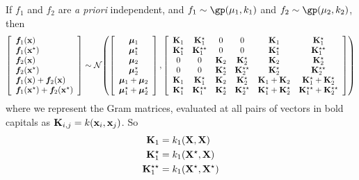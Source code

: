 If $f_1$ and $f_2$ are \emph{a priori} independent, and $f_1 \sim \gp( \mu_1, k_1)$ and $f_2 \sim \gp( \mu_2, k_2)$, then
%
\begin{align}
\left[ \begin{array}{l} 
\boldsymbol{f}_1({\bf{x}}) \\
\boldsymbol{f}_1({\bf{x}}^\star) \\
\boldsymbol{f}_2({\bf{x}}) \\
\boldsymbol{f}_2({\bf{x}}^\star) \\
\boldsymbol{f}_1({\bf{x}}) + \boldsymbol{f}_2({\bf{x}}) \\
\boldsymbol{f}_1({\bf{x}}^\star) + \boldsymbol{f}_2({\bf{x}}^\star)
\end{array} \right]
\sim
\mathcal{N}\!\left(
\left[ \begin{array}{c} \boldsymbol{\mu}_1 \\ \boldsymbol{\mu}_1^\star \\ \boldsymbol{\mu}_2 \\ \boldsymbol{\mu}_2^\star \\ \boldsymbol{\mu}_1 + \boldsymbol{\mu}_2 \\ \boldsymbol{\mu}_1^\star + \boldsymbol{\mu}_2^\star \end{array} \right]
,\left[ \begin{array}{cccccc} 
\mathbf{K}_1 & \mathbf{K}_1^\star & 0 & 0 & \mathbf{K}_1 & \mathbf{K}_1^\star \\ 
\mathbf{K}_1^\star & \mathbf{K}_1^{\star\star} & 0 & 0 & \mathbf{K}_1^\star & \mathbf{K}_1^{\star\star} \\
0 & 0 & \mathbf{K}_2 & \mathbf{K}_2^\star & \mathbf{K}_2 & \mathbf{K}_2^\star \\ 
0 & 0 & \mathbf{K}_2^\star & \mathbf{K}_2^{\star\star} & \mathbf{K}_2^\star & \mathbf{K}_2^{\star\star} \\
\mathbf{K}_1 & \mathbf{K}_1^\star & \mathbf{K}_2 & \mathbf{K}_2^\star & \mathbf{K}_1 + \mathbf{K}_2 & \mathbf{K}_1^\star + \mathbf{K}_2^\star \\ 
\mathbf{K}_1^\star & \mathbf{K}_1^{\star\star}  & \mathbf{K}_2^\star & \mathbf{K}_2^{\star\star}  & \mathbf{K}_1^\star + \mathbf{K}_2^\star & \mathbf{K}_1^{\star\star} + \mathbf{K}_2^{\star\star}\\
\end{array} \right]
\right)
\end{align}
%
where we represent the Gram matrices, evaluated at all pairs of vectors in bold capitals as ${\mathbf{K}_{i,j} = k({\bf{x}}_i, {\bf{x}}_j)}$.  So 
%
\begin{align}
\mathbf{K}_1 & = k_1( \mathbf{X}, \mathbf{X} ) \\
\mathbf{K}_1^\star & = k_1( \mathbf{X}^\star, \mathbf{X} ) \\
\mathbf{K}_1^{\star\star} & = k_1( \mathbf{X}^\star, \mathbf{X}^\star )
\end{align}


